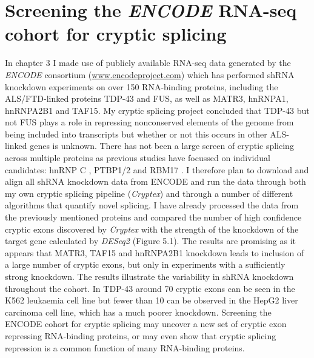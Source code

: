 \section{Screening the \textit{ENCODE} RNA-seq cohort for cryptic splicing}
In chapter 3 I made use of publicly available RNA-seq data generated by the \textit{ENCODE} consortium (\url{www.encodeproject.com}) which has performed shRNA knockdown experiments on over 150 RNA-binding proteins, including the ALS/FTD-linked proteins TDP-43 and FUS, as well as MATR3, hnRNPA1, hnRNPA2B1 and TAF15. My cryptic splicing project concluded that TDP-43 but not FUS plays a role in repressing nonconserved elements of the genome from being included into transcripts but whether or not this occurs in other ALS-linked genes is unknown. There has not been a large screen of cryptic splicing across multiple proteins as previous studies have focussed on individual candidates: hnRNP C \citep{Zarnack2013-nv}, PTBP1/2 \citep{Ling2016} and RBM17 \citep{Tan07102016}.
I therefore plan to download and align all shRNA knockdown data from ENCODE and run the data through both my own cryptic splicing pipeline (\textit{Cryptex}) and through a number of different algorithms that quantify novel splicing. I have already processed the data from the previously mentioned proteins and compared the number of high confidence cryptic exons discovered by \textit{Cryptex} with the strength of the knockdown of the target gene calculated by \textit{DESeq2} \citep{Love2014} (Figure 5.1). The results are promising as it appears that MATR3, TAF15 and hnRNPA2B1 knockdown leads to inclusion of a large number of cryptic exons, but only in experiments with a sufficiently strong knockdown. The results illustrate the variability in shRNA knockdown throughout the cohort. In TDP-43 around 70 cryptic exons can be seen in the K562 leukaemia cell line but fewer than 10 can be observed in the HepG2 liver carcinoma cell line, which has a much poorer knockdown. Screening the ENCODE cohort for cryptic splicing may uncover a new set of cryptic exon repressing RNA-binding proteins, or may even show that cryptic splicing repression is a common function of many RNA-binding proteins. 

